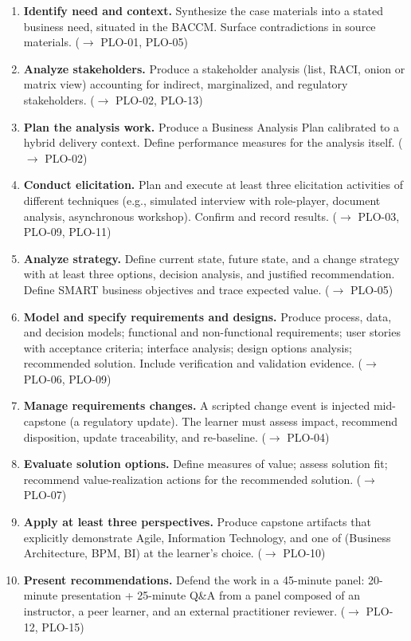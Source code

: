 \documentclass[11pt,letterpaper,oneside]{report}
\begin{document}
\begin{enumerate}
  \item \textbf{Identify need and context.} Synthesize the case materials into a stated business need, situated in the BACCM. Surface contradictions in source materials. ($\to$ PLO-01, PLO-05)
  \item \textbf{Analyze stakeholders.} Produce a stakeholder analysis (list, RACI, onion or matrix view) accounting for indirect, marginalized, and regulatory stakeholders. ($\to$ PLO-02, PLO-13)
  \item \textbf{Plan the analysis work.} Produce a Business Analysis Plan calibrated to a hybrid delivery context. Define performance measures for the analysis itself. ($\to$ PLO-02)
  \item \textbf{Conduct elicitation.} Plan and execute at least three elicitation activities of different techniques (e.g., simulated interview with role-player, document analysis, asynchronous workshop). Confirm and record results. ($\to$ PLO-03, PLO-09, PLO-11)
  \item \textbf{Analyze strategy.} Define current state, future state, and a change strategy with at least three options, decision analysis, and justified recommendation. Define SMART business objectives and trace expected value. ($\to$ PLO-05)
  \item \textbf{Model and specify requirements and designs.} Produce process, data, and decision models; functional and non-functional requirements; user stories with acceptance criteria; interface analysis; design options analysis; recommended solution. Include verification and validation evidence. ($\to$ PLO-06, PLO-09)
  \item \textbf{Manage requirements changes.} A scripted change event is injected mid-capstone (a regulatory update). The learner must assess impact, recommend disposition, update traceability, and re-baseline. ($\to$ PLO-04)
  \item \textbf{Evaluate solution options.} Define measures of value; assess solution fit; recommend value-realization actions for the recommended solution. ($\to$ PLO-07)
  \item \textbf{Apply at least three perspectives.} Produce capstone artifacts that explicitly demonstrate Agile, Information Technology, and one of (Business Architecture, BPM, BI) at the learner's choice. ($\to$ PLO-10)
  \item \textbf{Present recommendations.} Defend the work in a 45-minute panel: 20-minute presentation + 25-minute Q\&A from a panel composed of an instructor, a peer learner, and an external practitioner reviewer. ($\to$ PLO-12, PLO-15)
\end{enumerate}
\end{document}
